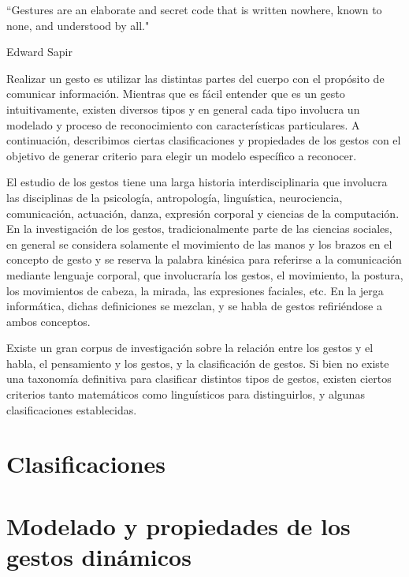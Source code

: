 \epigraph{``Gestures are an elaborate and secret code that is written nowhere, known to none, and understood by all."}{Edward Sapir}

Realizar un gesto es utilizar las distintas partes del cuerpo con el propósito de comunicar información. Mientras que es fácil entender que es un gesto intuitivamente, existen diversos tipos y en general cada tipo involucra un modelado y proceso de reconocimiento con características particulares. A continuación, describimos ciertas clasificaciones y propiedades de los gestos con el objetivo de generar criterio para elegir un modelo específico a reconocer.

El estudio de los gestos tiene una larga historia interdisciplinaria que involucra las disciplinas de la psicología, antropología, linguística, neurociencia, comunicación, actuación, danza, expresión corporal y ciencias de la computación. En la investigación de los gestos, tradicionalmente parte de las ciencias sociales, en general se considera solamente el movimiento de las manos y los brazos en el concepto de gesto y se reserva la palabra kinésica para referirse a la comunicación mediante lenguaje corporal, que involucraría los gestos, el movimiento, la postura, los movimientos de cabeza, la mirada, las expresiones faciales, etc. En la jerga informática, dichas definiciones se mezclan, y se habla de gestos refiriéndose a ambos conceptos.

Existe un gran corpus de investigación sobre la relación entre los gestos y el habla, el pensamiento y los gestos, y la clasificación de gestos. Si bien no existe una taxonomía definitiva para clasificar distintos tipos de gestos, existen ciertos criterios tanto matemáticos como linguísticos para distinguirlos, y algunas clasificaciones establecidas.


\section{Clasificaciones}


\section{Modelado y propiedades de los gestos dinámicos}
